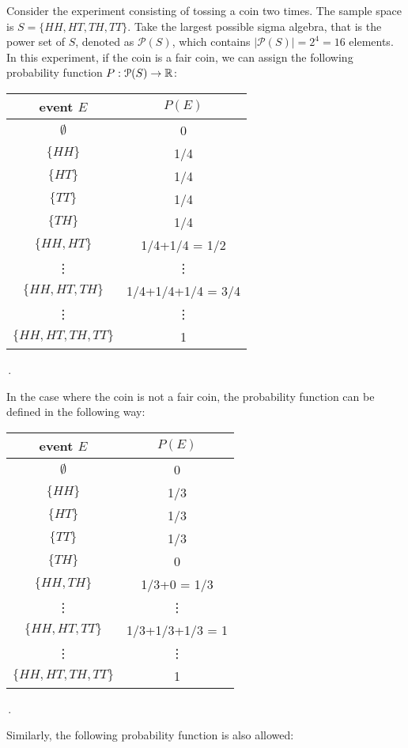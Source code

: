 \begin{ex}
    Consider the experiment consisting of tossing a coin two times. The sample space is $S = \{HH, HT, TH, TT\}$. Take the largest possible sigma algebra, that is the power set of $S$, denoted as $\mathcal{P}(S)$, which contains $|\mathcal{P}(S)| = 2^4 = 16$ elements. In this experiment, if the coin is a fair coin, we can assign the following probability function $P: \mathcal{P}(S)\to \mathbb{R}$:
\begin{center}
\begin{tabular}{|c|c|}
\hline \rowcolor{lightgray}
\textbf{event $E$} & $P(E)$\\
\hline
$\emptyset$ & 0 \\
\hline
$\{HH\}$ & 1/4\\
\hline
$\{HT\}$ & 1/4\\
\hline
$\{TT\}$ & 1/4\\
\hline
$\{TH\}$ & 1/4\\
\hline
$\{HH, HT\}$ & 1/4+1/4 = 1/2\\
\hline
\vdots & \vdots \\
\hline
$\{HH, HT, TH\}$ & 1/4+1/4+1/4 = 3/4\\
\hline 
\vdots & \vdots \\
\hline
$\{HH, HT, TH, TT\}$ & 1\\
\hline
\end{tabular}\,.
\end{center}
In the case where the coin is not a fair coin, the probability function can be defined in the following way:
\begin{center}
\begin{tabular}{|c|c|}
\hline \rowcolor{lightgray}
\textbf{event $E$} & $P(E)$\\
\hline
$\emptyset$ & 0 \\
\hline
$\{HH\}$ & 1/3\\
\hline
$\{HT\}$ & 1/3\\
\hline
$\{TT\}$ & 1/3\\
\hline
$\{TH\}$ & 0\\
\hline
$\{HH, TH\}$ & 1/3+0 = 1/3\\
\hline
\vdots & \vdots \\
\hline
$\{HH, HT, TT\}$ & 1/3+1/3+1/3 = 1\\
\hline 
\vdots & \vdots \\
\hline
$\{HH, HT, TH, TT\}$ & 1\\
\hline
\end{tabular}\,.
\end{center}
Similarly, the following probability function is also allowed:

\end{ex}
